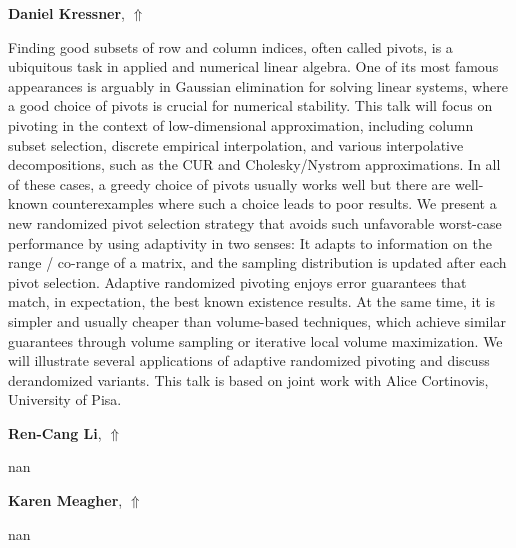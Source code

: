 \documentclass[ILAS2025-program.tex]{subfiles}
\begin{document}
     \hypertarget{down0004}{}\begin{ilasabstract}
    
    \textbf{Daniel Kressner},  \hfill \hyperlink{up0004}{$\Uparrow$}
    
    \mtskip
    Finding good subsets of row and column indices, often called pivots, is a ubiquitous task in applied and numerical linear algebra. One of its most famous appearances is arguably in Gaussian elimination for solving linear systems, where a good choice of pivots is crucial for numerical stability. This talk will focus on pivoting in the context of low-dimensional approximation, including column subset selection, discrete empirical interpolation, and various interpolative decompositions, such as the CUR and Cholesky/Nystrom approximations. In all of these cases, a greedy choice of pivots usually works well but there are well-known counterexamples where such a choice leads to poor results. We present a new randomized pivot selection strategy that avoids such unfavorable worst-case performance by using adaptivity in two senses: It adapts to information on the range / co-range of a matrix, and the sampling distribution is updated after each pivot selection. Adaptive randomized pivoting enjoys error guarantees that match, in expectation, the best known existence results. At the same time, it is   simpler and usually cheaper than volume-based techniques, which achieve similar guarantees through volume sampling or iterative local volume maximization. We will illustrate several applications of adaptive randomized pivoting and discuss derandomized variants. This talk is based on joint work with Alice Cortinovis, University of Pisa.\end{ilasabstract}
     \hypertarget{down0008}{}\begin{ilasabstract}
    
    \textbf{Ren-Cang Li},  \hfill \hyperlink{up0008}{$\Uparrow$}
    
    \mtskip
    nan\end{ilasabstract}
     \hypertarget{down0007}{}\begin{ilasabstract}
    
    \textbf{Karen Meagher},  \hfill \hyperlink{up0007}{$\Uparrow$}
    
    \mtskip
    nan\end{ilasabstract}
\end{document}
